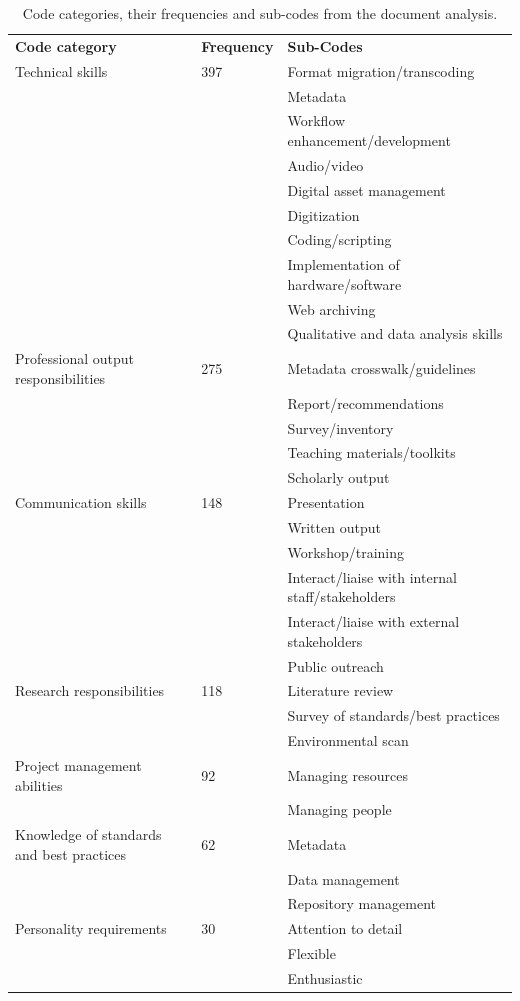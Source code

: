 \documentclass{acm_proc_article-sp}
\begin{document}
\begin{table}[t!]
\begin{tabular}{lll}
\textbf{Code category} & \textbf{Frequency} & \textbf{Sub-Codes} \\
Technical skills & 397 & Format migration/transcoding \\
\multicolumn{2}{l}{\multirow{9}{*}{}} & Metadata \\
\multicolumn{2}{l}{} & Workflow enhancement/development \\
\multicolumn{2}{l}{} & Audio/video \\
\multicolumn{2}{l}{} & Digital asset management \\
\multicolumn{2}{l}{} & Digitization \\
\multicolumn{2}{l}{} & Coding/scripting \\
\multicolumn{2}{l}{} & Implementation of hardware/software \\
\multicolumn{2}{l}{} & Web archiving \\
\multicolumn{2}{l}{} & Qualitative and data analysis skills \\
Professional output responsibilities & 275 & Metadata crosswalk/guidelines \\
\multicolumn{2}{l}{\multirow{4}{*}{}} & Report/recommendations \\
\multicolumn{2}{l}{} & Survey/inventory \\
\multicolumn{2}{l}{} & Teaching materials/toolkits \\
\multicolumn{2}{l}{} & Scholarly output \\
Communication skills & 148 & Presentation \\
\multicolumn{2}{l}{\multirow{5}{*}{}} & Written output \\
\multicolumn{2}{l}{} & Workshop/training \\
\multicolumn{2}{l}{} & Interact/liaise with internal staff/stakeholders \\
\multicolumn{2}{l}{} & Interact/liaise with external stakeholders \\
\multicolumn{2}{l}{} & Public outreach \\
Research responsibilities & 118 & Literature review \\
\multicolumn{2}{l}{\multirow{2}{*}{}} & Survey of standards/best practices \\
\multicolumn{2}{l}{} & Environmental scan \\
Project management abilities & 92 & Managing resources \\
\multicolumn{2}{l}{} & Managing people \\
Knowledge of standards and best practices & 62 & Metadata \\
\multicolumn{2}{l}{\multirow{2}{*}{}} & Data management \\
\multicolumn{2}{l}{} & Repository management \\
Personality requirements & 30 & Attention to detail \\
 &  & Flexible \\
 &  & Enthusiastic
\end{tabular}
\caption{Code categories, their frequencies and sub-codes from the document analysis.}
\label{my-label}
\end{table}
\end{document}
